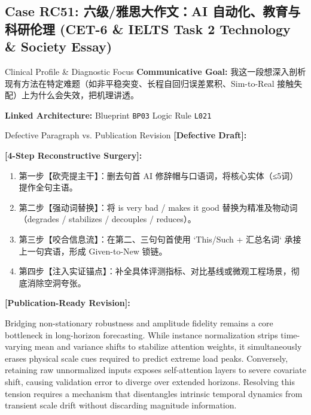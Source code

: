 \subsection{Case RC51: 六级/雅思大作文：AI 自动化、教育与科研伦理 (CET-6 \& IELTS Task 2 Technology \& Society Essay)}\label{case:RC51}
\begin{ConceptBox}{Clinical Profile \& Diagnostic Focus}
\textbf{Communicative Goal:} 我这一段想深入剖析现有方法在特定难题（如非平稳突变、长程自回归误差累积、Sim-to-Real 接触失配）上为什么会失效，把机理讲透。\par
\textbf{Linked Architecture:} Blueprint \texttt{BP03} \enspace\textbar\enspace Logic Rule \texttt{L021}
\end{ConceptBox}
\begin{ExampleBox}{Defective Paragraph vs. Publication Revision}
\textbf{\color{TargetHighlight}[Defective Draft]:}\par
{}\par\vspace{6pt}
\textbf{\color{AcadForest}[4-Step Reconstructive Surgery]:}
\begin{enumerate}[label=\textbf{\color{AcadNavy}Step \arabic*:}, leftmargin=2em]
  \item 第一步【砍壳提主干】：删去句首 AI 修辞帽与口语词，将核心实体（≤5词）提作全句主语。
  \item 第二步【强动词替换】：将 is very bad / makes it good 替换为精准及物动词（degrades / stabilizes / decouples / reduces）。
  \item 第三步【咬合信息流】：在第二、三句句首使用 `This/Such + 汇总名词` 承接上一句宾语，形成 Given-to-New 锁链。
  \item 第四步【注入实证锚点】：补全具体评测指标、对比基线或微观工程场景，彻底消除空洞夸张。
\end{enumerate}\vspace{4pt}
\textbf{\color{AcadNavy}[Publication-Ready Revision]:}\par
Bridging non-stationary robustness and amplitude fidelity remains a core bottleneck in long-horizon forecasting. While instance normalization strips time-varying mean and variance shifts to stabilize attention weights, it simultaneously erases physical scale cues required to predict extreme load peaks. Conversely, retaining raw unnormalized inputs exposes self-attention layers to severe covariate shift, causing validation error to diverge over extended horizons. Resolving this tension requires a mechanism that disentangles intrinsic temporal dynamics from transient scale drift without discarding magnitude information.
\end{ExampleBox}
